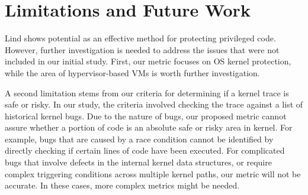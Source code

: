 \section{Limitations and Future Work}
\label{sec.limitation}

Lind shows potential as an effective method for protecting privileged code. However, 
further investigation is needed to address the issues that were not included in our
initial study.
First, our metric 
focuses on OS kernel protection, while the area of hypervisor-based
VMs is worth further investigation.

A second limitation stems from our criteria for determining if a kernel trace is
safe or risky. In our study, the criteria involved checking the trace against a list
of historical kernel bugs.
Due to the nature of bugs, our proposed metric cannot assure whether a portion of code
is an absolute safe or risky area in kernel.
For example, bugs that are caused
by a race condition cannot be identified by directly checking if certain lines of
code have been executed. For complicated bugs that involve defects in the internal
kernel data structures, or require complex triggering conditions across multiple
kernel paths, our metric will not be accurate. 
In these cases, more complex metrics might be needed.




